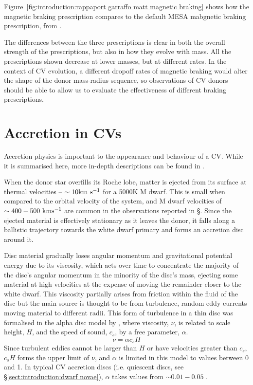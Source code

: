 Figure~\ref{fig:introduction:rappaport garraffo matt magnetic braking} shows how the \citet{matt2015} magnetic braking prescription compares to the default MESA mabgnetic braking prescription, from \citet{rappaport1983}. 

The differences between the three prescriptions is clear in both the overall strength of the prescriptions, but also in how they evolve with mass. All the prescriptions shown decrease at lower masses, but at different rates. In the context of CV evolution, a different dropoff rates of magnetic braking would alter the shape of the donor mass-radius sequence, so observations of CV donors should be able to allow us to evaluate the effectiveness of different braking prescriptions.


\section{Accretion in CVs}
\label{sect:introduction:accretion}
Accretion physics is important to the appearance and behaviour of a CV. While it is summarised here, more in-depth descriptions can be found in \citet{warner1995, hellier2001, ritter2010}.

When the donor star overfills its Roche lobe, matter is ejected from its surface at thermal velocities -- $\sim 10 \rm km\ s^{-1}$ for a 5000K M dwarf. This is small when compared to the orbital velocity of the system, and M dwarf velocities of $\sim 400-500 \rm\ km s^{-1}$ are common in the observations reported in \S{}. Since the ejected material is effectively stationary as it leaves the donor, it falls along a ballistic trajectory towards the white dwarf primary and forms an accretion disc around it. 

Disc material gradually loses angular momentum and gravitational potential energy due to its viscosity, which acts over time to concentrate the majority of the disc's angular momentum in the minority of the disc's mass, ejecting some material at high velocities at the expense of moving the remainder closer to the white dwarf. This viscosity partially arises from friction within the fluid of the disc but the main source is thought to be from turbulence, random eddy currents moving material to different radii. This form of turbulence in a thin disc was formalised in the alpha disc model by \citet{shakura1973}, where viscosity, $\nu$, is related to scale height, $H$, and the speed of sound, $c_s$, by a free parameter, $\alpha$.
\begin{equation}
    \label{eqn:disc viscocity}
    \nu = \alpha c_s H
\end{equation}
Since turbulent eddies cannot be larger than $H$ or have velocities greater than $c_s$, $c_s H$ forms the upper limit of $\nu$, and $\alpha$ is limited in this model to values between 0 and 1. In typical CV accretion discs (i.e. quiescent discs, see \S\ref{sect:introduction:dwarf novae}), $\alpha$ takes values from $\sim 0.01 - 0.05$ \citet{hellier2001}.

